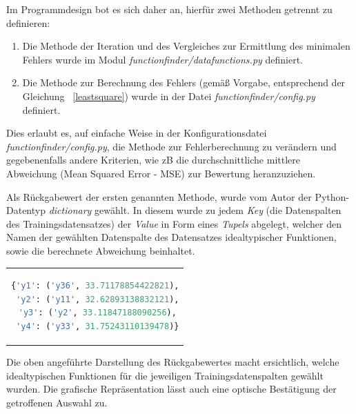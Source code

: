 Im Programmdesign bot es sich daher an, hierfür zwei Methoden getrennt zu definieren:
\begin{enumerate}
 \itemsep0pt
 \item Die Methode der Iteration und des Vergleiches zur Ermittlung des minimalen Fehlers wurde im Modul \emph{functionfinder/datafunctions.py} definiert.
 \item Die Methode zur Berechnung des Fehlers (gemäß Vorgabe, entsprechend der Gleichung ~\ref{leastsquare}) wurde in der Datei \emph{functionfinder/config.py} definiert.
\end{enumerate}

Dies erlaubt es, auf einfache Weise in der Konfigurationsdatei \emph{functionfinder/config.py}, die Methode zur Fehlerberechnung zu verändern und gegebenenfalls andere Kriterien, wie zB die durchschnittliche mittlere Abweichung (Mean Squared Error - MSE) zur Bewertung heranzuziehen. 

Als Rückgabewert der ersten genannten Methode, wurde vom Autor der Python-Datentyp \emph{dictionary} gewählt. In diesem wurde zu jedem \emph{Key} (die Datenspalten des Trainingsdatensatzes) der \emph{Value} in Form eines \emph{Tupels} abgelegt, welcher den Namen der gewählten Datenspalte des Datensatzes idealtypischer Funktionen, sowie die berechnete Abweichung beinhaltet.

\begin{tabular}{c}  %
\begin{lstlisting}[language=python,
				   caption={Darstellung des Rückgabewertes der berechneten Übereinstimmungen},
				   label=dictresult]
{'y1': ('y36', 33.71178854422821),
 'y2': ('y11', 32.62893138832121),
 'y3': ('y2', 33.11847188090256),
 'y4': ('y33', 31.75243110139478)}
\end{lstlisting}
\end{tabular}

Die oben angeführte Darstellung des Rückgabewertes macht ersichtlich, welche idealtypischen Funktionen für die jeweiligen Trainingsdatenspalten gewählt wurden. Die grafische Repräsentation lässt auch eine optische Bestätigung der getroffenen Auswahl zu.

